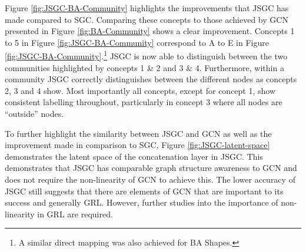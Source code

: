 

Figure \ref{fig:JSGC-BA-Community} highlights the improvements that JSGC has made compared to SGC.
Comparing these concepts to those achieved by GCN presented in Figure \ref{fig:BA-Community} shows a clear improvement.
Concepts 1 to 5 in Figure \ref{fig:JSGC-BA-Community} correspond to A to E in Figure \ref{fig:JSGC-BA-Community}.\footnote{A similar direct mapping was also achieved for BA Shapes.}
JSGC is now able to distinguish between the two communities highlighted by concepts 1 \& 2 and 3 \& 4.
Furthermore, within a community JSGC correctly distinguishes between the different nodes as concepts 2, 3 and 4 show.
Most importantly all concepts, except for concept 1, show consistent labelling throughout, particularly in concept 3 where all nodes are ``outside'' nodes.

To further highlight the similarity between JSGC and GCN as well as the improvement made in comparison to SGC, Figure \ref{fig:JSGC-latent-space} demonstrates the latent space of the concatenation layer in JSGC.
This demonstrates that JSGC has comparable graph structure awareness to GCN and does not require the non-linearity of GCN to achieve this.
The lower accuracy of JSGC still suggests that there are elements of GCN that are important to its success and generally GRL.
However, further studies into the importance of non-linearity in GRL are required.

